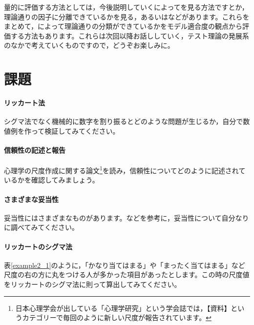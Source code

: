 \documentclass{ltjsbook}
\begin{document}
量的に評価する方法としては，今後説明していくによってを見る方法ですとか，理論通りの因子に分離できているかを見る，あるいはなどがあります。これらをまとめて，によって理論通りの分類ができているかをモデル適合度の観点から評価する方法もあります。これらは次回以降お話ししていく，テスト理論の発展系のなかで考えていくものですので，どうぞお楽しみに。

\section{課題}
\paragraph{リッカート法}シグマ法でなく機械的に数字を割り振るとどのような問題が生じるか，自分で数値例を作って検証してみてください。
\paragraph{信頼性の記述と報告}心理学の尺度作成に関する論文\footnote{日本心理学会が出している「心理学研究」という学会誌では，【資料】というカテゴリーで毎回のように新しい尺度が報告されています。}を読み，信頼性についてどのように記述されているかを確認してみましょう。
\paragraph{さまざまな妥当性}妥当性にはさまざまなものがあります。\citet{kosugi2016b}などを参考に，妥当性について自分なりに調べてみてください。
\paragraph{リッカートのシグマ法} 表\ref{example2_1}のように，「かなり当てはまる」や「まったく当てはまる」など尺度の右の方に丸をつける人が多かった項目があったとします。この時の尺度値をリッカートのシグマ法に則って算出してみてください。
\end{document}

